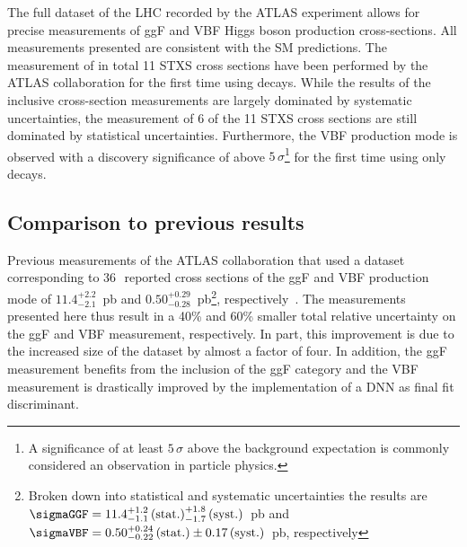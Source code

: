 The full \RunTwo dataset of the LHC recorded by the ATLAS experiment allows for precise measurements of ggF and VBF Higgs boson production cross-sections.
All measurements presented are consistent with the SM predictions. 
The measurement of in total 11 STXS cross sections have been performed by the ATLAS collaboration for the first time using \HWW decays. 
While the results of the inclusive cross-section measurements are largely dominated by systematic uncertainties, the measurement of 6 of the 11 STXS cross sections are still dominated by statistical uncertainties. 
Furthermore, the VBF production mode is observed with a discovery significance of above $5\,\sigma$\footnote{A significance of at least $5\,\sigma$ above the background expectation is commonly considered an observation in particle physics.} for the first time using only \HWW decays.

\subsection{Comparison to previous results}
Previous \RunTwo measurements of the ATLAS collaboration that used a dataset corresponding to 36\,\ifb\ reported cross sections of the ggF and VBF production mode of $11.4^{+2.2}_{-2.1}$~pb and $0.50^{+0.29}_{-0.28}$~pb\footnote{Broken down into statistical and systematic uncertainties the results are $\sigmaGGF = 11.4^{+1.2}_{-1.1}\,\text{(stat.)}^{+1.8}_{-1.7}\,\text{(syst.)}$~pb and $\sigmaVBF= 0.50^{+0.24}_{-0.22}\,\text{(stat.)}\pm 0.17\,\text{(syst.)}$~pb, respectively}, respectively~\cite{HIGG-2016-07}.
The measurements presented here thus result in a 40\% and 60\% smaller total relative uncertainty on the ggF and VBF measurement, respectively. In part, this improvement is due to the increased size of the dataset by almost a factor of four.
In addition, the ggF measurement benefits from the inclusion of the ggF \TwoJet category and the VBF measurement is drastically improved by the implementation of a DNN as final fit discriminant. 

